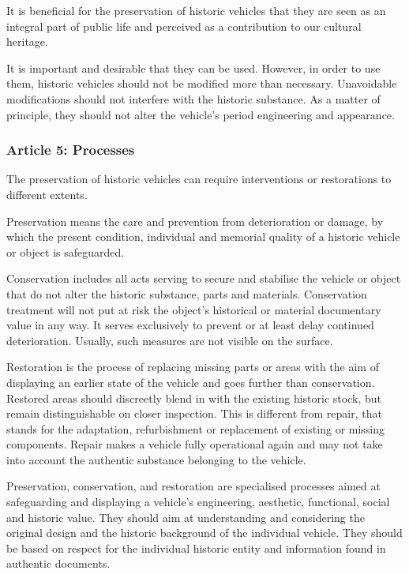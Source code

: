 \documentclass[12pt]{article}
\begin{document}
It is beneficial for the preservation of historic vehicles that they are seen as an integral part of public life and perceived as a contribution to our cultural heritage.

It is important and desirable that they can be used. However, in order to use them, historic vehicles should not be modified more than necessary. Unavoidable modifications should not interfere with the historic substance. As a matter of principle, they should not alter the vehicle’s period engineering and appearance.


\subsubsection{Article 5: Processes}

The preservation of historic vehicles can require interventions or restorations to different extents.

Preservation means the care and prevention from deterioration or damage, by which the present condition, individual and memorial quality of a historic vehicle or object is safeguarded.

Conservation includes all acts serving to secure and stabilise the vehicle or object that do not alter the historic substance, parts and materials. Conservation treatment will not put at risk the object’s historical or material documentary value in any way. It serves exclusively to prevent or at least delay continued deterioration. Usually, such measures are not visible on the surface.

Restoration is the process of replacing missing parts or areas with the aim of displaying an earlier state of the vehicle and goes further than conservation. Restored areas should discreetly blend in with the existing historic stock, but remain distinguishable on closer inspection. This is different from repair, that stands for the adaptation, refurbishment or replacement of existing or missing components. Repair makes a vehicle fully operational again and may not take into account the authentic substance belonging to the vehicle.

Preservation, conservation, and restoration are specialised processes aimed at safeguarding and displaying a vehicle’s engineering, aesthetic, functional, social and historic value. They should aim at understanding and considering the original design and the historic background of the individual vehicle. They should be based on respect for the individual historic entity and information found in authentic documents.
\end{document}
